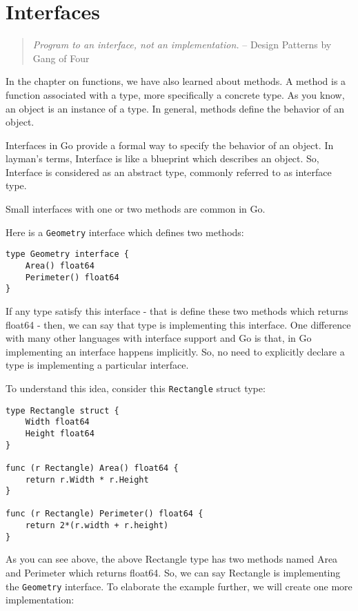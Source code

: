\cleardoublepage
{}
\chapter{Interfaces}

\begin{quote}
\textit{Program to an interface, not an implementation.} -- Design Patterns by Gang of Four
\end{quote}


In the chapter on functions, we have also learned about methods.  A
method is a function associated with a type, more specifically a
concrete type.  As you know, an object is an instance of a type.  In
general, methods define the behavior of an object.

Interfaces in Go provide a formal way to specify the
behavior of an object.  In layman's terms, Interface is like a
blueprint which describes an object.  So, Interface is considered as
an abstract type, commonly referred to as interface type.

Small interfaces with one or two methods are common in Go.

Here is a \texttt{Geometry} interface which defines two methods:

\begin{lstlisting}[numbers=none]
type Geometry interface {
    Area() float64
    Perimeter() float64
}
\end{lstlisting}

If any type satisfy this interface - that is define these two methods
which returns float64 - then, we can say that type is implementing
this interface.  One difference with many other languages with
interface support and Go is that, in Go implementing an interface
happens implicitly.  So, no need to explicitly declare a type is
implementing a particular interface.

To understand this idea, consider this \texttt{Rectangle} struct type:

\begin{lstlisting}[numbers=none]
type Rectangle struct {
    Width float64
    Height float64
}

func (r Rectangle) Area() float64 {
    return r.Width * r.Height
}

func (r Rectangle) Perimeter() float64 {
    return 2*(r.width + r.height)
}
\end{lstlisting}

As you can see above, the above Rectangle type has two methods named
Area and Perimeter which returns float64.  So, we can say Rectangle is
implementing the \texttt{Geometry} interface.  To elaborate the
example further, we will create one more implementation:

